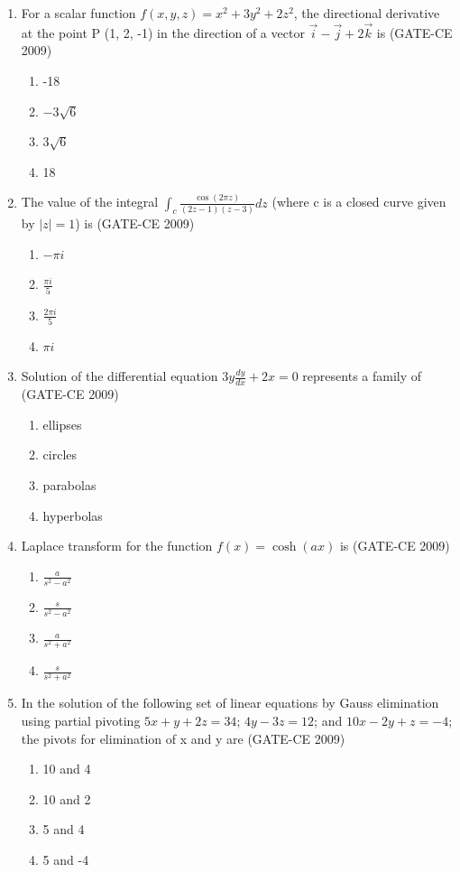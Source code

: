 \documentclass[12pt]{article}
\begin{document}
\begin{enumerate}[label=Q.\arabic*]
    \item For a scalar function $f(x, y, z) = x^2 + 3y^2 + 2z^2$, the directional derivative at the point P (1, 2, -1) in the direction of a vector $\vec{i} - \vec{j} + 2\vec{k}$ is (GATE-CE 2009)
    \begin{enumerate}[label=(\Alph*)]
        \item -18 
        \item $-3\sqrt{6}$ 
        \item $3\sqrt{6}$ 
        \item 18
    \end{enumerate}

    \item The value of the integral $\int_{c} \frac{\cos(2\pi z)}{(2z-1)(z-3)} dz$ (where c is a closed curve given by $|z|=1$) is (GATE-CE 2009)
    \begin{enumerate}[label=(\Alph*)]
        \item $-\pi i$ 
        \item $\frac{\pi i}{5}$ 
        \item $\frac{2\pi i}{5}$ 
        \item $\pi i$
    \end{enumerate}
    
    \item Solution of the differential equation $3y\frac{dy}{dx}+2x=0$ represents a family of (GATE-CE 2009)
    \begin{enumerate}[label=(\Alph*)]
        \item ellipses 
        \item circles 
        \item parabolas 
        \item hyperbolas
    \end{enumerate}
    
    \item Laplace transform for the function $f(x)=\cosh(ax)$ is (GATE-CE 2009)
    \begin{enumerate}[label=(\Alph*)]
        \item $\frac{a}{s^2-a^2}$ 
        \item $\frac{s}{s^2-a^2}$ 
        \item $\frac{a}{s^2+a^2}$ 
        \item $\frac{s}{s^2+a^2}$
    \end{enumerate}
    
    \item In the solution of the following set of linear equations by Gauss elimination using partial pivoting $5x+y+2z=34$;  $4y-3z=12$; and  $10x-2y+z=-4$; 
    the pivots for elimination of x and y are (GATE-CE 2009)
    \begin{enumerate}[label=(\Alph*)]
        \item 10 and 4 
        \item 10 and 2 
        \item 5 and 4 
        \item 5 and -4
    \end{enumerate}
    

\end{enumerate}
\end{document}
